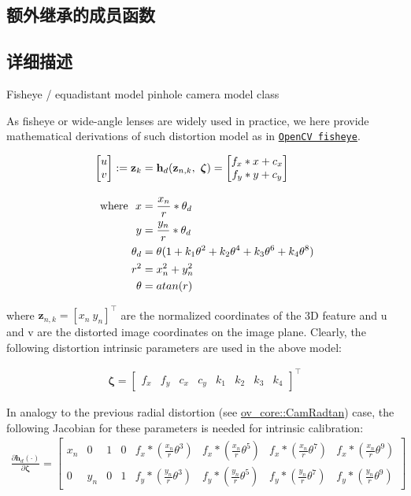 \subsection*{额外继承的成员函数}


\subsection{详细描述}
Fisheye / equadistant model pinhole camera model class 

As fisheye or wide-\/angle lenses are widely used in practice, we here provide mathematical derivations of such distortion model as in \href{https://docs.opencv.org/3.4/db/d58/group__calib3d__fisheye.html#details}{\tt Open\+CV fisheye}.

\begin{align*} \begin{bmatrix} u \\ v \end{bmatrix}:= \mathbf{z}_k &= \mathbf h_d(\mathbf{z}_{n,k}, ~\boldsymbol\zeta) = \begin{bmatrix} f_x * x + c_x \\ f_y * y + c_y \end{bmatrix}\\[1em] \empty {\rm where}~~ x &= \frac{x_n}{r} * \theta_d \\ y &= \frac{y_n}{r} * \theta_d \\ \theta_d &= \theta (1 + k_1 \theta^2 + k_2 \theta^4 + k_3 \theta^6 + k_4 \theta^8) \\ \quad r^2 &= x_n^2 + y_n^2 \\ \theta &= atan(r) \end{align*}

where $ \mathbf{z}_{n,k} = [ x_n ~ y_n ]^\top$ are the normalized coordinates of the 3D feature and u and v are the distorted image coordinates on the image plane. Clearly, the following distortion intrinsic parameters are used in the above model\+:

\begin{align*} \boldsymbol\zeta = \begin{bmatrix} f_x & f_y & c_x & c_y & k_1 & k_2 & k_3 & k_4 \end{bmatrix}^\top \end{align*}

In analogy to the previous radial distortion (see \hyperlink{classov__core_1_1CamRadtan}{ov\+\_\+core\+::\+Cam\+Radtan}) case, the following Jacobian for these parameters is needed for intrinsic calibration\+: \begin{align*} \frac{\partial \mathbf h_d (\cdot)}{\partial \boldsymbol\zeta} = \begin{bmatrix} x_n & 0 & 1 & 0 & f_x*(\frac{x_n}{r}\theta^3) & f_x*(\frac{x_n}{r}\theta^5) & f_x*(\frac{x_n}{r}\theta^7) & f_x*(\frac{x_n}{r}\theta^9) \\[5pt] 0 & y_n & 0 & 1 & f_y*(\frac{y_n}{r}\theta^3) & f_y*(\frac{y_n}{r}\theta^5) & f_y*(\frac{y_n}{r}\theta^7) & f_y*(\frac{y_n}{r}\theta^9) \end{bmatrix} \end{align*}

